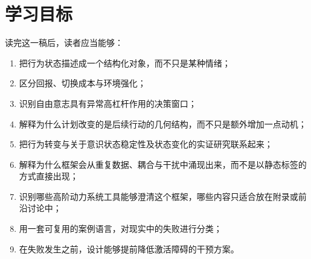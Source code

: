 \section{学习目标}

读完这一稿后，读者应当能够：
\begin{enumerate}[nosep]
  \item 把行为状态描述成一个结构化对象，而不只是某种情绪；
  \item 区分回报、切换成本与环境强化；
  \item 识别自由意志具有异常高杠杆作用的决策窗口；
  \item 解释为什么计划改变的是后续行动的几何结构，而不只是额外增加一点动机；
  \item 把行为转变与关于意识状态稳定性及状态变化的实证研究联系起来；
  \item 解释为什么框架会从重复数据、耦合与干扰中涌现出来，而不是以静态标签的方式直接出现；
  \item 识别哪些高阶动力系统工具能够澄清这个框架，哪些内容只适合放在附录或前沿讨论中；
  \item 用一套可复用的案例语言，对现实中的失败进行分类；
  \item 在失败发生之前，设计能够提前降低激活障碍的干预方案。
\end{enumerate}